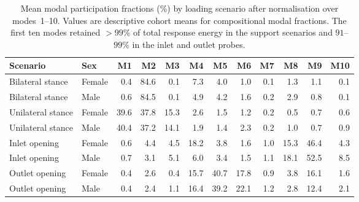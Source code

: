 \documentclass[openacc]{rsproca_new}
\begin{document}
\begin{table}[p]
\centering
\caption{Mean modal participation fractions (\%) by loading scenario after normalisation over modes~1--10. Values are descriptive cohort means for compositional modal fractions. The first ten modes retained $>99\%$ of total response energy in the support scenarios and $91$--$99\%$ in the inlet and outlet probes.}
\label{tab:loadcases}
\begin{tabular}{llrrrrrrrrrr}
\toprule
Scenario & Sex & M1 & M2 & M3 & M4 & M5 & M6 & M7 & M8 & M9 & M10 \\
\midrule
Bilateral stance & Female & 0.4 & 84.6 & 0.1 & 7.3 & 4.0 & 1.0 & 0.1 & 1.3 & 1.1 & 0.1 \\
Bilateral stance & Male   & 0.6 & 84.5 & 0.1 & 4.9 & 4.2 & 1.6 & 0.2 & 2.9 & 0.8 & 0.1 \\
Unilateral stance & Female & 39.6 & 37.8 & 15.3 & 2.6 & 1.5 & 1.2 & 0.2 & 0.5 & 0.7 & 0.6 \\
Unilateral stance & Male   & 40.4 & 37.2 & 14.1 & 1.9 & 1.4 & 2.3 & 0.2 & 1.0 & 0.7 & 0.9 \\
Inlet opening & Female & 0.6 & 4.4 & 4.5 & 18.2 & 3.8 & 1.6 & 1.0 & 15.3 & 46.4 & 4.3 \\
Inlet opening & Male   & 0.7 & 3.1 & 5.1 & 6.0 & 3.4 & 1.5 & 1.1 & 18.1 & 52.5 & 8.5 \\
Outlet opening & Female & 0.4 & 2.6 & 0.4 & 15.7 & 40.7 & 17.8 & 0.9 & 3.8 & 16.1 & 1.6 \\
Outlet opening & Male   & 0.4 & 2.4 & 1.1 & 16.4 & 39.2 & 22.1 & 1.2 & 2.8 & 12.4 & 2.1 \\
\bottomrule
\end{tabular}
\end{table}
\end{document}
